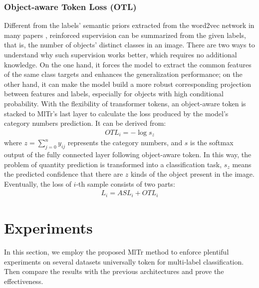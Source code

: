 \documentclass{article} \usepackage[numbers,sort&compress]{natbib}
\begin{document}
\subsubsection{Object-aware Token Loss (OTL)}
Different from the labels' semantic priors extracted from the word2vec network in many papers \cite{chen2019multi,you2020cross,chen2019learning}, reinforced supervision can be summarized from the given labels, that is, the number of objects' distinct classes in an image. There are two ways to understand why such supervision works better, which requires no additional knowledge. On the one hand, it forces the model to extract the common features of the same class targets and enhances the generalization performance; on the other hand, it can make the model build a more robust corresponding projection between features and labels, especially for objects with high conditional probability. With the flexibility of transformer tokens, an object-aware token is stacked to MlTr's last layer to calculate the loss produced by the model's category numbers prediction. It can be derived from:
\begin{eqnarray}
OTL_{i} = -\log s_z
\end{eqnarray}
where $z=\sum_{j=0}^{n}y_{ij}$ represents the category numbers, and $s$ is the softmax output of the fully connected layer following object-aware token. In this way, the problem of quantity prediction is transformed into a classification task, $s_z$ means the predicted confidence that there are $z$ kinds of the object present in the image. \\
Eventually, the loss of $i$-th sample consists of two parts:
\begin{eqnarray}
L_{i} = ASL_i+OTL_i
\end{eqnarray}




\section{Experiments}
\label{result}
In this section, we employ the proposed MlTr method to enforce plentiful experiments on several datasets universally token for multi-label classification. Then compare the results with the previous architectures and prove the effectiveness.
\end{document}
